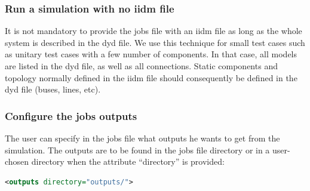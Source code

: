 \documentclass[a4paper, 12pt]{report}
\begin{document}
\subsubsection{Run a simulation with no iidm file}
\label{sec:Run a simulation with no iidm file}

It is not mandatory to provide the jobs file with an iidm file as long as the whole system is described in the dyd file. We use this technique for small test cases such as unitary test cases with a few number of components. In that case, all models are listed in the dyd file, as well as all connections. Static components and topology normally defined in the iidm file should consequently be defined in the dyd file (buses, lines, etc).

\subsubsection{Configure the jobs outputs}
\label{sec:Configure the jobs outputs}

The user can specify in the jobs file what outputs he wants to get from the simulation. The outputs are to be found in the jobs file directory or in a user-chosen directory when the attribute ``directory'' is provided:

\begin{lstlisting}[language=XML,numbers=none]
<outputs directory="outputs/">
\end{lstlisting}
\end{document}
